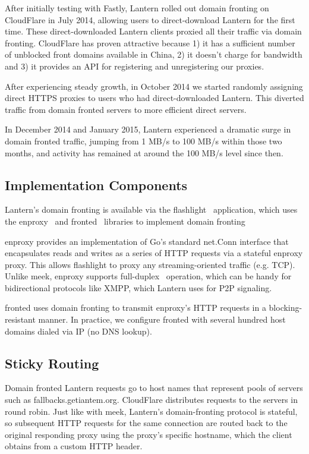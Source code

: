 \documentclass{sig-alternate}
\begin{document}
After initially testing with Fastly, Lantern rolled out domain fronting on
CloudFlare in July 2014, allowing users to direct-download Lantern for the first
time. These direct-downloaded Lantern clients proxied all their traffic via
domain fronting. CloudFlare has proven attractive because 1) it has a sufficient
number of unblocked front domains available in China, 2) it doesn't charge for
bandwidth and 3) it provides an API for registering and unregistering our
proxies.

After experiencing steady growth, in October 2014 we started randomly assigning
direct HTTPS proxies to users who had direct-downloaded Lantern. This diverted
traffic from domain fronted servers to more efficient direct servers.

In December 2014 and January 2015, Lantern experienced a dramatic surge in
domain fronted traffic, jumping from 1 MB/s to 100 MB/s within those two
months, and activity has remained at around the 100 MB/s level since then.

\subsection{Implementation Components}
Lantern's domain fronting is available via the flashlight~\cite{flashlight}
application, which uses the enproxy~\cite{enproxy} and fronted~\cite{fronted}
libraries to implement domain fronting

enproxy provides an implementation of Go's standard net.Conn interface that
encapsulates reads and writes as a series of HTTP requests via a stateful
enproxy proxy. This allows flashlight to proxy any streaming-oriented
traffic (e.g. TCP). Unlike meek, enproxy supports
full-duplex~\cite{beating-gfw-with-go} operation, which can be handy for
bidirectional protocols like XMPP, which Lantern uses for P2P signaling.

fronted uses domain fronting to transmit enproxy's HTTP requests in a
blocking-resistant manner. In practice, we configure fronted with several
hundred host domains dialed via IP (no DNS lookup).

\subsection{Sticky Routing}
Domain fronted Lantern requests go to host names that represent pools of servers
such as fallbacks.getiantem.org. CloudFlare distributes requests to the servers
in round robin. Just like with meek, Lantern's domain-fronting protocol is
stateful, so subsequent HTTP requests for the same connection are routed back to
the original responding proxy using the proxy's specific hostname, which the
client obtains from a custom HTTP header.
\end{document}
